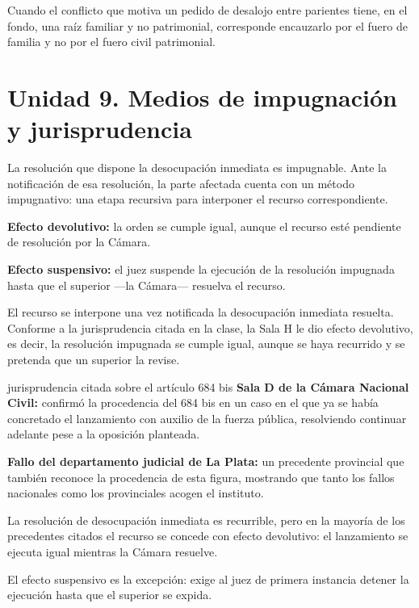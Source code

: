 \documentclass[12pt,oneside]{book}
\begin{document}
\begin{note}
Cuando el conflicto que motiva un pedido de desalojo entre parientes tiene, en el fondo, una raíz familiar y no patrimonial, corresponde encauzarlo por el fuero de familia y no por el fuero civil patrimonial.
\end{note}

\section{Unidad 9. Medios de impugnación y jurisprudencia}

La resolución que dispone la desocupación inmediata es impugnable. Ante la notificación de esa resolución, la parte afectada cuenta con un método impugnativo: una etapa recursiva para interponer el recurso correspondiente.

\begin{important}
\textbf{Efecto devolutivo:} la orden se cumple igual, aunque el recurso esté pendiente de resolución por la Cámara.

\textbf{Efecto suspensivo:} el juez suspende la ejecución de la resolución impugnada hasta que el superior ---la Cámara--- resuelva el recurso.
\end{important}

El recurso se interpone una vez notificada la desocupación inmediata resuelta. Conforme a la jurisprudencia citada en la clase, la Sala H le dio efecto devolutivo, es decir, la resolución impugnada se cumple igual, aunque se haya recurrido y se pretenda que un superior la revise.

\begin{example}{jurisprudencia citada sobre el artículo 684 bis}
\textbf{Sala D de la Cámara Nacional Civil:} confirmó la procedencia del 684 bis en un caso en el que ya se había concretado el lanzamiento con auxilio de la fuerza pública, resolviendo continuar adelante pese a la oposición planteada.

\textbf{Fallo del departamento judicial de La Plata:} un precedente provincial que también reconoce la procedencia de esta figura, mostrando que tanto los fallos nacionales como los provinciales acogen el instituto.
\end{example}

\begin{important}
La resolución de desocupación inmediata es recurrible, pero en la mayoría de los precedentes citados el recurso se concede con efecto devolutivo: el lanzamiento se ejecuta igual mientras la Cámara resuelve.

El efecto suspensivo es la excepción: exige al juez de primera instancia detener la ejecución hasta que el superior se expida.
\end{important}
\end{document}
